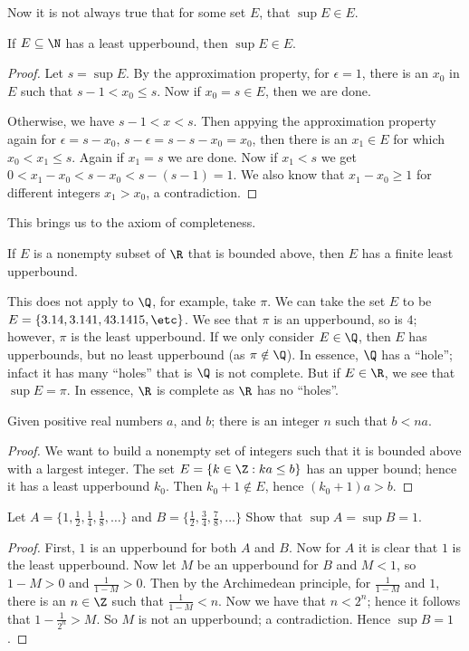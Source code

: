 Now it is not always true that for some set $E$, that $\sup{E} \in E$.

\begin{remark}
  If $E \subseteq \N$ has a least upperbound, then $\sup{E} \in E$.
\end{remark}
\begin{proof}
  Let $s=\sup{E}$. By the approximation property, for $\epsilon=1$, there is an $x_0$ in $E$ such that $s-1 < x_0 \leq s$. 
  Now if $x_0=s \in E$, then we are done.

  Otherwise, we have $s-1<x<s$. Then appying the approximation property again for $\epsilon=s-x_0$, $s-\epsilon=s-s-x_0=x_0$, 
  then there is an $x_1 \in E$ for which $x_0<x_1 \leq s$. Again if $x_1=s$ we are done. Now if $x_1<s$ we get $0<x_1-x_0<s-x_0<s-(s-1)=1$. 
  We also know that $x_1-x_0 \geq 1$ for different integers $x_1>x_0$, a contradiction.
\end{proof}

This brings us to the axiom of completeness.

\begin{postulate}
  If $E$ is a  nonempty subset of $\R$ that is bounded above, then $E$ has a finite least upperbound.
\end{postulate}

This does not apply to $\Q$, for example, take $\pi$. We can take the set $E$ to be $E=\{3.14,3.141,43.1415, \etc\}$. 
We see that $\pi$ is an upperbound, so is $4$; however, $\pi$ is the least upperbound. If we only consider $E \in \Q$, then 
$E$ has upperbounds, but no least upperbound (as $\pi \notin \Q$). In essence, $\Q$ has a ``hole''; infact it has many ``holes'' 
that is $\Q$ is not complete. But if $E \in \R$, we see that $\sup{E}=\pi$. In essence, $\R$ is complete as $\R$ has no ``holes''.

\begin{theorem}
  Given positive real numbers $a$, and $b$; there is an integer $n$ such that $b<na$.
\end{theorem}
\begin{proof}
  We want to build a nonempty set of integers such that it is bounded above with a largest integer. The set 
  $E=\{k \in \Z: ka \leq b\}$ has an upper bound; hence it has a least upperbound $k_0$. Then $k_0+1 \notin E$, hence $(k_0+1)a>b$.
\end{proof}

\begin{example}
  Let $A=\{1,\frac{1}{2},\frac{1}{4},\frac{1}{8}, \dots\}$ and $B=\{\frac{1}{2},\frac{3}{4},\frac{7}{8}, \dots\}$ Show that $\sup{A}=\sup{B}=1$.
\end{example}
\begin{proof}
  First, $1$ is an upperbound for both $A$ and $B$. Now for $A$ it is clear that $1$ is the least upperbound. Now let $M$ be 
  an upperbound for $B$ and $M<1$, so $1-M>0$ and $\frac{1}{1-M}>0$. Then by the Archimedean principle, for $\frac{1}{1-M}$ 
  and $1$, there is an $n \in \Z$ such that $\frac{1}{1-M}<n$. Now we have that $n<2^n$; hence it follows that $1-\frac{1}{2^n}>M$. 
  So $M$ is not an upperbound; a contradiction. Hence $\sup{B}=1$.
\end{proof}

